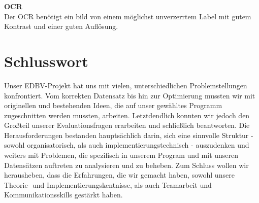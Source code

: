 \documentclass[paper=A4, deutsch]{scrartcl}
\begin{document}
\textbf{OCR}\\
Der OCR benötigt ein bild von einem möglichst unverzerrtem Label mit gutem Kontrast und einer guten Auflösung.\\


\section{Schlusswort}
Unser EDBV-Projekt hat uns mit vielen, unterschiedlichen Problemstellungen konfrontiert. Vom korrekten Datensatz bis hin zur Optimierung mussten wir mit originellen und bestehenden Ideen, die auf unser gewähltes Programm zugeschnitten werden mussten, arbeiten. Letztdendlich konnten wir jedoch den Großteil unserer Evaluationsfragen erarbeiten und schließlich beantworten. Die Herausforderungen bestanden hauptsächlich darin, sich eine sinnvolle Struktur - sowohl organisatorisch, als auch implementierungstechnisch - auszudenken und weiters mit Problemen, die spezifisch in unserem Program und mit unseren Datensätzen auftreten zu analysieren und zu beheben. Zum Schluss wollen wir herausheben, dass die Erfahrungen, die wir gemacht haben, sowohl unsere Theorie- und Implementierungskentnisse, als auch Teamarbeit und Kommunikationsskills gestärkt haben.



\end{document}

